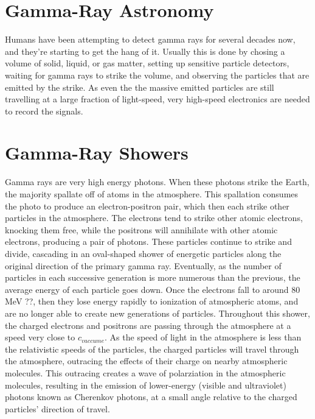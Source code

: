 \section{Gamma-Ray Astronomy}
Humans have been attempting to detect gamma rays for several decades now, and they're starting to get the hang of it.
Usually this is done by chosing a volume of solid, liquid, or gas matter, setting up sensitive particle detectors, waiting for gamma rays to strike the volume, and observing the particles that are emitted by the strike.
As even the the massive emitted particles are still travelling at a large fraction of light-speed, very high-speed electronics are needed to record the signals.


\section{Gamma-Ray Showers}
Gamma rays are very high energy photons.
When these photons strike the Earth, the majority spallate off of atoms in the atmosphere.
This spallation consumes the photo to produce an electron-positron pair, which then each strike other particles in the atmosphere.
The electrons tend to strike other atomic electrons, knocking them free, while the positrons will annihilate with other atomic electrons, producing a pair of photons.
These particles continue to strike and divide, cascading in an oval-shaped shower of energetic particles along the original direction of the primary gamma ray.
Eventually, as the number of particles in each successive generation is more numerous than the previous, the average energy of each particle goes down.
Once the electrons fall to around 80 MeV ??, then they lose energy rapidly to ionization of atmospheric atoms, and are no longer able to create new generations of particles.
Throughout this shower, the charged electrons and positrons are passing through the atmosphere at a speed very close to $c_{vaccume}$.
As the speed of light in the atmosphere is less than the relativistic speeds of the particles, the charged particles will travel through the atmosphere, outracing the effects of their charge on nearby atmospheric molecules.
This outracing creates a wave of polarziation in the atmospheric molecules, resulting in the emission of lower-energy (visible and ultraviolet) photons known as Cherenkov photons, at a small angle relative to the charged particles' direction of travel.

